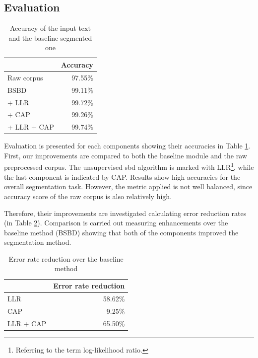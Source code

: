 \subsection{Evaluation}


\begin{table}[H]
\centering
\caption{Accuracy of the input text and the baseline segmented one}
\label{tab:base}
\begin{tabular}{ l  r } 
\hline
& Accuracy \\ 
\hline
Raw corpus  & 97.55\% \\
BSBD & 99.11\% \\
+ LLR & 99.72\% \\
+ CAP & 99.26\% \\
+ LLR + CAP & 99.74\% \\
\hline
\end{tabular}
\end{table}

Evaluation is presented for each components showing their accuracies in Table \ref{tab:base}.
First, our improvements are compared to both the baseline module and the raw preprocessed corpus.
The unsupervised \acrshort{sbd} algorithm is marked with LLR\footnote{Referring to the term log-likelihood ratio.}, while the last component is indicated by CAP.
Results show high accuracies for the overall segmentation task.
However, the metric applied is not well balanced, since accuracy score of the raw corpus is also relatively high.

Therefore, their improvements are investigated calculating error reduction rates (in Table \ref{tab:reduction}). 
Comparison is carried out measuring enhancements over the baseline method (BSBD) showing that both of the components improved the segmentation method.

\begin{table}[H]
\centering
\caption{Error rate reduction over the baseline method}
\label{tab:reduction}
\begin{tabular}{ l  r } 
\hline
& Error rate reduction\\
\hline
LLR & 58.62\% \\
CAP & 9.25\% \\
LLR + CAP & 65.50\% \\
\hline
\end{tabular}
\end{table}

